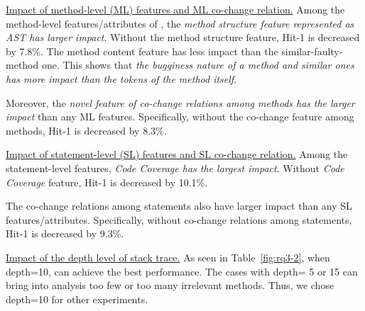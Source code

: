 \underline{Impact of method-level (ML) features and ML co-change relation.}
Among the method-level features/attributes of {\tool}, the {\it method
structure feature represented as AST has larger impact}. Without
the method structure feature, Hit-1 is decreased by 7.8\%.
The method content feature has less impact than the
similar-faulty-method one. This shows that {\em the bugginess nature
of a method and similar ones has more impact than the tokens of the
method itself}.

Moreover, the {\em novel feature of co-change relations among methods
has} 
{\em the larger impact} than any ML features.
Specifically, without the co-change feature among methods, Hit-1 is
decreased by 8.3\%.


\underline{Impact of statement-level (SL) features and SL co-change relation.}
Among the statement-level features, {\it Code Coverage
has the largest impact}. Without {\it Code Coverage} feature,
Hit-1 is decreased by 10.1\%.

The co-change relations among statements also have larger
impact than any SL features/attributes. Specifically, without
co-change relations among statements, Hit-1 is decreased by 9.3\%.





\underline{Impact of the depth level of stack trace.} 
As seen in Table~\ref{fig:rq3-2},
when depth=10, {\tool} can achieve the best performance. The
cases with depth= 5 or 15 can bring into analysis too few or too many
irrelevant methods. Thus, we chose depth=10 for other experiments.


